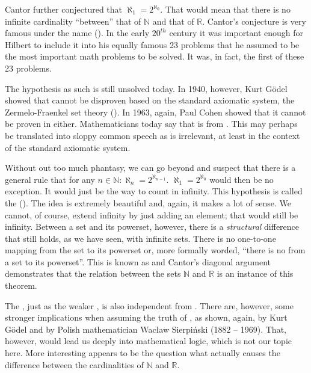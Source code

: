 \documentclass[tikz]{scrreprt}
\begin{document}
Cantor further conjectured that
$\aleph_1 = 2^{\aleph_0}$.
That would mean that there is no infinite cardinality
``between'' that of $\mathbb{N}$ and that of $\mathbb{R}$.
Cantor's conjecture is very famous under the name
 ().
In the early $20^{th}$ century it was important enough
for Hilbert to include it into his equally famous 23 problems
that he assumed to be the most important math problems
to be solved. It was, in fact, the first of these 23 problems.

The hypothesis as such is still unsolved today.
In 1940, however, Kurt Gödel showed
that  cannot be disproven based on the standard
axiomatic system, the Zermelo-Fraenkel set theory ().
In 1963, again, Paul Cohen showed
that it cannot be proven in  either.
Mathematicians today say that  
is  from .
This may perhaps be translated into sloppy common speech as
 is irrelevant, at least in the context
of the standard axiomatic system.

Without out too much phantasy, 
we can go beyond  and suspect 
that there is a general rule that
for any $n \in \mathbb{N}: \aleph_n=2^{\aleph_{n-1}}$.
$\aleph_1=2^{\aleph_0}$ would then be no exception.
It would just be the way to count in infinity.
This hypothesis is called the
 ().
The idea is extremely beautiful and, again,
it makes a lot of sense.
We cannot, of course, extend infinity
by just adding an element; that would still be infinity.
Between a set and its powerset, however, there is
a \emph{structural} difference that still holds,
as we have seen, with infinite sets.
There is no one-to-one mapping 
from the set to its powerset or, more formally worded,
``there is
no  from a set to its powerset''.
This is known as  and
Cantor's diagonal argument demonstrates that 
the relation between the sets
$\mathbb{N}$ and $\mathbb{R}$
is an instance of this theorem.

The , just as the weaker ,
is also independent from .
There are, however, some stronger implications
when assuming the truth of , as shown, again,
by Kurt Gödel and by Polish mathematician
Wac\l{}aw Sierpiński (1882 -- 1969).
That, however, would lead us deeply 
into mathematical logic, which is not our topic here.
More interesting appears to be the question
what actually causes the difference between
the cardinalities of $\mathbb{N}$ and $\mathbb{R}$.
\end{document}
